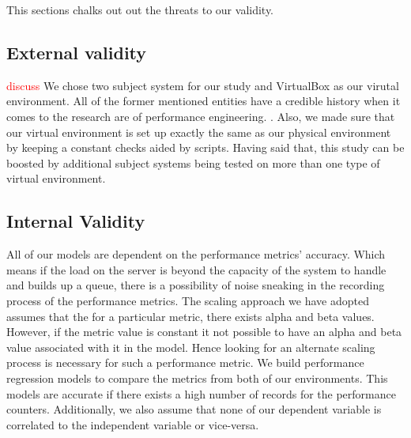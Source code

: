 This sections chalks out out the threats to our validity.
\subsection{External validity}
\textcolor{red}{discuss}
We chose two subject system for our study and VirtualBox as our virutal environment. All of the former mentioned entities have a credible history when it comes to the research are of performance engineering. \cite{5306331} \cite{Nguyen:2012:ADP:2188286.2188344}. Also, we made sure that our virtual environment is set up exactly the same as our physical environment by keeping a constant checks aided by scripts. Having said that, this study can be boosted by additional subject systems being tested on more than one type of virtual environment. 

\subsection{Internal Validity}

All of our models are dependent on the performance metrics' accuracy. Which means if the load on the server is beyond the capacity of the system to handle and builds up a queue, there is a possibility of noise sneaking in the recording process of the performance metrics. 
The scaling approach we have adopted assumes that the for a particular metric, there exists alpha and beta values. However, if the metric value is constant it not possible to have an alpha and beta value associated with it in the model. Hence looking for an alternate scaling process is necessary for such a performance metric.
We build performance regression models to compare the metrics from both of our environments. This models are accurate if there exists a high number of records for the performance counters. Additionally, we also assume that none of our dependent variable is correlated to the independent variable or vice-versa. 
